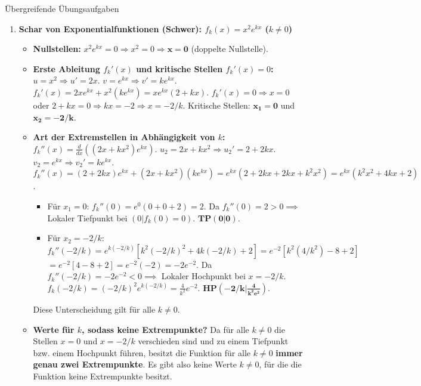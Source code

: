 \begin{loesungsumgebung}{Übergreifende Übungsaufgaben}
\begin{enumerate}
    \item \textbf{Schar von Exponentialfunktionen (Schwer): $f_k(x) = x^2 e^{kx}$ ($k \neq 0$)}
    \begin{itemize}
        \item \textbf{Nullstellen:} $x^2 e^{kx} = 0 \Rightarrow x^2=0 \Rightarrow \mathbf{x=0}$ (doppelte Nullstelle).
        \item \textbf{Erste Ableitung $f_k'(x)$ und kritische Stellen $f_k'(x)=0$:}
        $u=x^2 \Rightarrow u'=2x$. $v=e^{kx} \Rightarrow v'=ke^{kx}$.
        $f_k'(x) = 2xe^{kx} + x^2(ke^{kx}) = xe^{kx}(2+kx)$.
        $f_k'(x)=0 \Rightarrow x=0$ oder $2+kx=0 \Rightarrow kx=-2 \Rightarrow x = -2/k$.
        Kritische Stellen: $\mathbf{x_1=0}$ und $\mathbf{x_2=-2/k}$.
        \item \textbf{Art der Extremstellen in Abhängigkeit von $k$:}
        $f_k''(x) = \frac{d}{dx}((2x+kx^2)e^{kx})$.
        $u_2=2x+kx^2 \Rightarrow u_2'=2+2kx$. $v_2=e^{kx} \Rightarrow v_2'=ke^{kx}$.
        $f_k''(x) = (2+2kx)e^{kx} + (2x+kx^2)(ke^{kx}) = e^{kx}(2+2kx+2kx+k^2x^2) = e^{kx}(k^2x^2+4kx+2)$.
        \begin{itemize}
            \item Für $x_1=0$: $f_k''(0) = e^0(0+0+2) = 2$. Da $f_k''(0)=2>0 \implies$ Lokaler Tiefpunkt bei $(0|f_k(0)=0)$. $\mathbf{TP(0|0)}$.
            \item Für $x_2=-2/k$:
            $f_k''(-2/k) = e^{k(-2/k)}[k^2(-2/k)^2 + 4k(-2/k) + 2] = e^{-2}[k^2(4/k^2) - 8 + 2]$
            $= e^{-2}[4 - 8 + 2] = e^{-2}(-2) = -2e^{-2}$.
            Da $f_k''(-2/k) = -2e^{-2} < 0 \implies$ Lokaler Hochpunkt bei $x=-2/k$.
            $f_k(-2/k) = (-2/k)^2 e^{k(-2/k)} = \frac{4}{k^2}e^{-2}$. $\mathbf{HP(-2/k | \frac{4}{k^2e^2})}$.
        \end{itemize}
        Diese Unterscheidung gilt für alle $k \neq 0$.
        \item \textbf{Werte für $k$, sodass keine Extrempunkte?}
        Da für alle $k \neq 0$ die Stellen $x=0$ und $x=-2/k$ verschieden sind und zu einem Tiefpunkt bzw. einem Hochpunkt führen, besitzt die Funktion für alle $k \neq 0$ \textbf{immer genau zwei Extrempunkte}. Es gibt also keine Werte $k \neq 0$, für die die Funktion keine Extrempunkte besitzt.
    \end{itemize}
\end{enumerate}


\end{loesungsumgebung}






